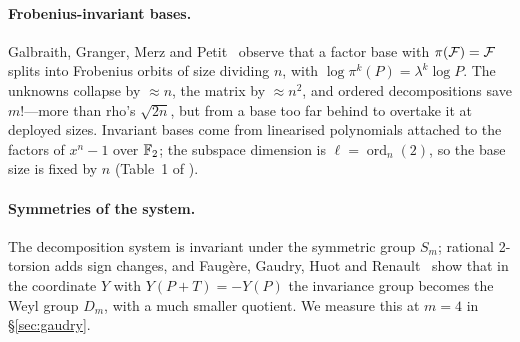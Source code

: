 \paragraph{Frobenius-invariant bases.} Galbraith, Granger, Merz and
Petit~\cite{ggmp2020} observe that a factor base with $\pi(\mathcal{F})=\mathcal{F}$ splits
into Frobenius orbits of size dividing $n$, with
$\log\pi^k(P)=\lambda^k\log P$. The unknowns collapse by $\approx n$, the
matrix by $\approx n^2$, and ordered decompositions save $m!$---more than
rho's $\sqrt{2n}$, but from a base too far behind to overtake it at
deployed sizes. Invariant bases come from linearised polynomials attached
to the factors of $x^n-1$ over $\mathbb{F}_2$; the subspace dimension is
$\ell=\operatorname{ord}_n(2)$, so the base size is fixed by $n$
(Table~1 of ).

\paragraph{Symmetries of the system.} The decomposition system is
invariant under the symmetric group $S_m$; rational 2-torsion adds sign
changes, and Faug\`ere, Gaudry, Huot and Renault~\cite{fghr2014} show that
in the coordinate $Y$ with $Y(P+T)=-Y(P)$ the invariance group becomes the
Weyl group $D_m$, with a much smaller quotient. We measure this at $m=4$
in \S\ref{sec:gaudry}.
